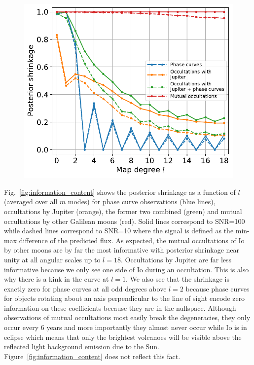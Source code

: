 \documentclass[modern]{aastex62}
\begin{document}
\begin{figure}[h!]
    \begin{centering}
    \includegraphics[width=0.5\linewidth]{figures/information_content.pdf}
    \end{centering}
\end{figure}

Fig.~\ref{fig:information_content} shows the posterior shrinkage as a function of $l$ (averaged over all $m$ modes) for phase curve observations (blue lines), occultations by Jupiter (orange), the former two combined (green) and mutual occultations by other Galilean moons (red).
Solid lines correspond to SNR=100 while dashed lines correspond to SNR=10 where the signal is defined as the min-max difference of the predicted flux.
As expected, the mutual occultations of Io by other moons are by far the most informative with posterior shrinkage near unity at all angular scales up to $l=18$. 
Occultations by Jupiter are far less informative because we only see one side of Io during an occultation.
This is also why there is a kink in the curve at $l=1$.
We also see that the shrinkage is exactly zero for phase curves at all odd degrees above $l=2$ because phase curves for objects rotating about an axis perpendicular to the line of sight encode zero information on these coefficients because they are in the nullspace.
Although observations of mutual occultations most easily break the degeneracies, they only occur every 6 years and more importantly they almost never occur while Io is in eclipse which means that only the brightest volcanoes will be visible above the reflected light background emission due to the Sun.
Figure~\ref{fig:information_content} does not reflect this fact.
\end{document}
